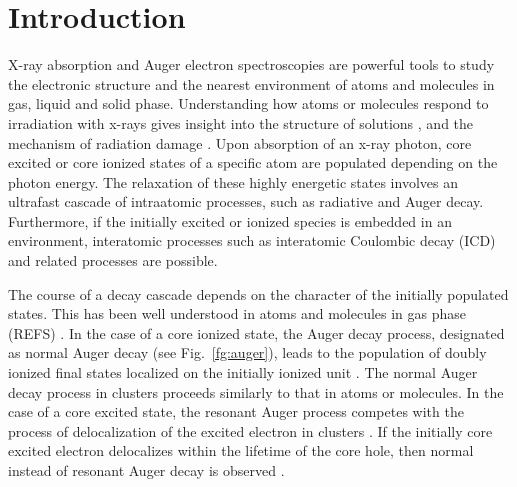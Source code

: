 \section{Introduction}


X-ray absorption and Auger electron spectroscopies are powerful tools to study the electronic structure and the nearest environment of atoms and molecules in gas, liquid and solid phase. Understanding how atoms or molecules respond to irradiation with x-rays gives insight into the structure of solutions \citep{Pokapanich09:7264}, and the mechanism of radiation damage \citep{ONeill02:329,Carugo05:213,Stumpf16:237}. Upon absorption of an x-ray photon, core excited or core ionized states of a specific atom are populated depending on the photon energy. The relaxation of these highly energetic states involves an ultrafast cascade of intraatomic processes, such as radiative and Auger decay. Furthermore, if the initially excited or ionized species is embedded in an environment, interatomic processes such as interatomic Coulombic decay (ICD) and related processes \citep{Pokapanich09:7264,Pokapanich11:13430,Stumpf16:237,unger17:708} are possible.


The course of a decay cascade depends on the character of the initially populated states. This has been well understood in atoms and molecules in gas phase (REFS) \citep{stoychev08:074307,Demekhin08:043421,Demekhin09:104303,Ouchi11:053415,Miteva14:164303,Miteva14:064307}. In the case of a core ionized state, the Auger decay process, designated as normal Auger decay (see Fig.\ \ref{fg:auger}), leads to the population of doubly ionized final states localized on the initially ionized unit \citep{stoychev08:074307,Demekhin08:043421,Demekhin09:104303,Ouchi11:053415}.  The normal Auger decay process in clusters proceeds similarly to that in atoms or molecules.  In the case of a core excited state, the resonant Auger process competes with the process of delocalization of the excited electron in clusters \citep{Bjorneholm95:3017}. If the initially core excited electron delocalizes within the lifetime of the core hole, then normal instead of resonant Auger decay is observed \citep{Bjorneholm95:3017}. 


